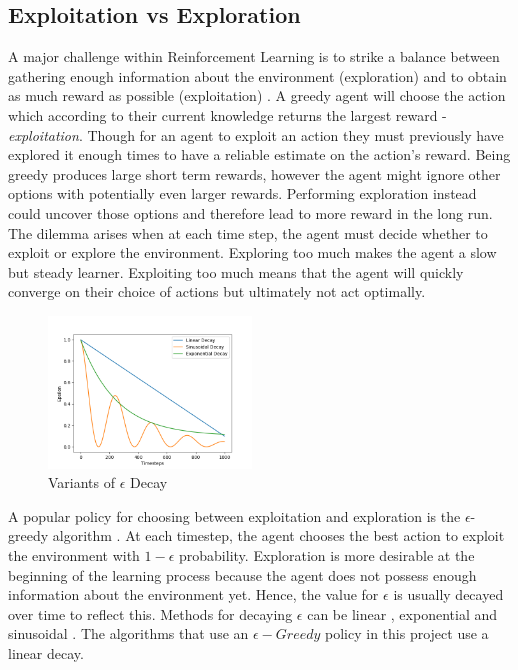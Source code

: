 \documentclass[notitlepage,a4paper,11pt]{article}
\begin{document}
\subsection{Exploitation vs Exploration}\label{exploit_explore}
A major challenge within Reinforcement Learning is to strike a balance between gathering enough information about the environment (exploration) and to obtain as much reward as possible (exploitation) \cite{sutton2011reinforcement}. A greedy agent will choose the action which according to their current knowledge returns the largest reward - \textit{exploitation}. Though for an agent to exploit an action they must previously have explored it enough times to have a reliable estimate on the action's reward. Being greedy produces large short term rewards, however the agent might ignore other options with potentially even larger rewards. Performing exploration instead could uncover those options and therefore lead to more reward in the long run. The dilemma arises when at each time step, the agent must decide whether to exploit or explore the environment. Exploring too much makes the agent a slow but steady learner. Exploiting too much means that the agent will quickly converge on their choice of actions but ultimately not act optimally.

\begin{figure}
\vspace{-40pt}
  \begin{center}
    \includegraphics[width=0.48\textwidth]{figs/epsilon_decay.png}
  \end{center}
  \vspace{-20pt}
  \caption{Variants of $\epsilon$ Decay}
\end{figure}

A popular policy for choosing between exploitation and exploration is the $\epsilon$-greedy algorithm \cite{white2012bandit}. At each timestep, the agent chooses the best action to exploit the environment with $1-\epsilon$ probability. Exploration is more desirable at the beginning of the learning process because the agent does not possess enough information about the environment yet. Hence, the value for $\epsilon$ is usually decayed over time to reflect this. Methods for decaying $\epsilon$ can be linear \cite{mnih2015human}, exponential \cite{maroti2019rbed} and sinusoidal  \cite{chuchro2017game}. The algorithms that use an $\epsilon-Greedy$ policy in this project use a linear decay.
\end{document}
